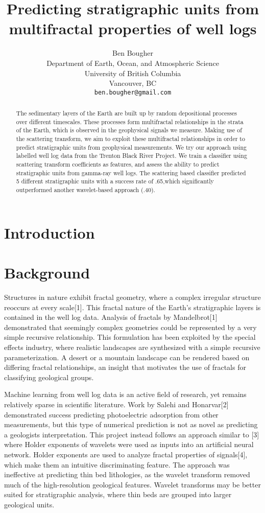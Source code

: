 \documentclass{article} %
\title{Predicting stratigraphic units from multifractal properties of
  well logs}
\author{
Ben Bougher\\
Department of Earth, Ocean, and Atmospheric Science\\
University of British Columbia\\
Vancouver, BC\\
\texttt{ben.bougher@gmail.com} 
}
\begin{document}
\maketitle

\begin{abstract}
The sedimentary layers of the Earth are built up by random depositional
processes over different timescales. These processes form multifractal
relationships in the strata of the Earth, which is observed in the
geophysical signals we measure. Making use of the scattering
transform, we aim to exploit these multifractal relationships in
order to predict stratigraphic units from geophysical measurements. We
try our approach using labelled well log data from the Trenton Black
River Project. We train a classifier using scattering transform
coefficients as features, and assess the ability to predict
stratigraphic units from gamma-ray well logs. The scattering based
classifier predicted 5 different stratigraphic units with a success
rate of .65,which significantly outperformed another wavelet-based
approach (.40).
\end{abstract}

\section{Introduction}


\section{Background}
Structures in nature exhibit fractal geometry, where a complex
irregular structure reoccurs at every scale[1]. This fractal nature of the
Earth's stratigraphic layers is contained in the well log
data. Analysis of fractals by Mandelbrot[1] demonstrated that seemingly complex geometries could
be represented by a very simple recursive relationship. This
formulation has been exploited by the special effects industry, where
realistic landscapes are synthesized with a simple
recursive parameterization. A desert or a mountain landscape
can be rendered based on differing fractal relationships, an insight
that motivates the use of fractals for classifying
geological groups. 

Machine learning from well log data is an active field of research,
yet remains relatively sparse in scientific
literature. Work by Salehi and Honarvar[2] demonstrated success predicting 
photoelectric adsorption from other measurements, but this type of numerical prediction is not
as novel as predicting a geologists interpretation. This project instead
follows an approach similar to [3] where Holder exponents
of wavelets were used as inputs into an artificial neural network. Holder
exponents are used to analyze fractal properties of signals[4], which
make them an intuitive discriminating feature. The approach was ineffective at
predicting thin bed lithologies, as the wavelet transform removed
much of the high-resolution geological features. Wavelet transforms
may be better suited for stratigraphic analysis, where thin beds
are grouped into larger geological units.
\end{document}
